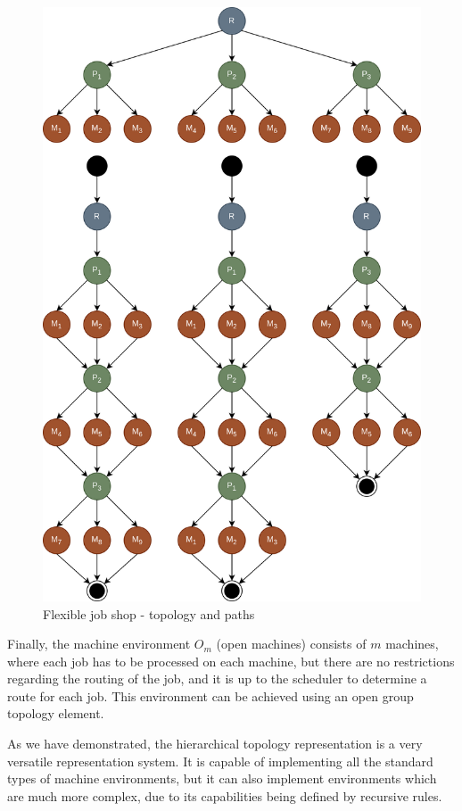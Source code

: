 \begin{figure}[!htbp]
	\centering
	\includegraphics[scale=0.3]{../images/flexible_job_shop.png}
	\caption{Flexible job shop - topology and paths}
    \label{fig:flexible_job_shop}
\end{figure}

Finally, the machine environment $O_m$ (open machines) consists of $m$ machines, where each job has to be processed on each machine, but there are no restrictions regarding the routing of the job, and it is up to the scheduler to determine a route for each job. This environment can be achieved using an open group topology element.

As we have demonstrated, the hierarchical topology representation is a very versatile representation system. It is capable of implementing all the standard types of machine environments, but it can also implement environments which are much more complex, due to its capabilities being defined by recursive rules.